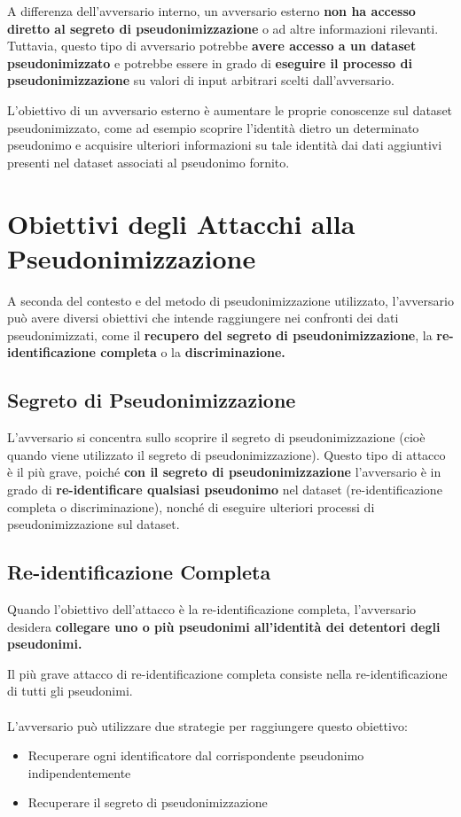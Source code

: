 A differenza dell'avversario interno, un avversario esterno\textbf{ non ha accesso diretto al segreto di pseudonimizzazione} o ad altre informazioni rilevanti. Tuttavia, questo tipo di avversario potrebbe \textbf{avere accesso a un dataset pseudonimizzato} e potrebbe essere in grado di \textbf{eseguire il processo di pseudonimizzazione} su valori di input arbitrari scelti dall'avversario.

L'obiettivo di un avversario esterno è aumentare le proprie conoscenze sul dataset pseudonimizzato, come ad esempio scoprire l'identità dietro un determinato pseudonimo e acquisire ulteriori informazioni su tale identità dai dati aggiuntivi presenti nel dataset associati al pseudonimo fornito.


\section{Obiettivi degli Attacchi alla Pseudonimizzazione}

A seconda del contesto e del metodo di pseudonimizzazione utilizzato, l'avversario può avere diversi obiettivi che intende raggiungere nei confronti dei dati pseudonimizzati, come il \textbf{recupero del segreto di pseudonimizzazione}, la \textbf{re-identificazione completa} o la \textbf{discriminazione.} 

\subsection{Segreto di Pseudonimizzazione}

L'avversario si concentra sullo scoprire il segreto di pseudonimizzazione (cioè quando viene utilizzato il segreto di pseudonimizzazione). Questo tipo di attacco è il più grave, poiché \textbf{con il segreto di pseudonimizzazione} l'avversario è in grado di\textbf{ re-identificare qualsiasi pseudonimo} nel dataset (re-identificazione completa o discriminazione), nonché di eseguire ulteriori processi di pseudonimizzazione sul dataset.

\subsection{Re-identificazione Completa}

Quando l'obiettivo dell'attacco è la re-identificazione completa, l'avversario desidera\textbf{ collegare uno o più pseudonimi all'identità dei detentori degli pseudonimi.}

Il più grave attacco di re-identificazione completa consiste nella re-identificazione di tutti gli pseudonimi. 
\\\\
L'avversario può utilizzare due strategie per raggiungere questo obiettivo: 
\begin{itemize}
    \item Recuperare ogni identificatore dal corrispondente pseudonimo indipendentemente 
    \item Recuperare il segreto di pseudonimizzazione
\end{itemize}

